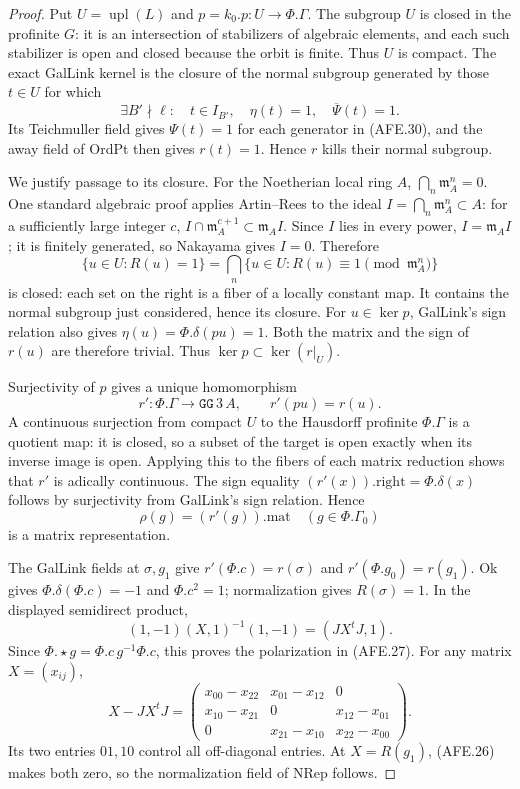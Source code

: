 \documentclass[11pt,a4paper]{article}
\numberwithin{equation}{section}
\theoremstyle{remark}\newtheorem{remark}[theorem]{Remark}
\begin{document}
\begin{proof}
Put \(U=\operatorname{upl}(L)\) and \(p=k_0.p:U\to\Phi.\Gamma\).
The subgroup \(U\) is closed in the profinite \(G\):
it is an intersection of stabilizers of algebraic
elements, and each such stabilizer is open and closed
because the orbit is finite.
Thus \(U\) is compact.
The exact GalLink kernel is the closure of the normal
subgroup generated by those \(t\in U\) for which
\[
 \exists B'\nmid\ell:\quad
 t\in I_{B'},\quad \eta(t)=1,\quad\overline\Psi(t)=1.
                                                        \tag{AFE.30}
\]
Its Teichmuller field gives \(\Psi(t)=1\) for each
generator in (AFE.30), and the away field of OrdPt
then gives \(r(t)=1\).
Hence \(r\) kills their normal subgroup.

We justify passage to its closure.
For the Noetherian local ring \(A\),
\(\bigcap_n\mathfrak m_A^n=0\).
One standard algebraic proof applies Artin--Rees
to the ideal \(I=\bigcap_n\mathfrak m_A^n\subset A\):
for a sufficiently large integer \(c\),
\(I\cap\mathfrak m_A^{c+1}\subset\mathfrak m_A I\).
Since \(I\) lies in every power, \(I=\mathfrak m_A I\);
it is finitely generated, so Nakayama gives \(I=0\).
Therefore
\[
 \{u\in U:R(u)=1\}=
 \bigcap_n\{u\in U:R(u)\equiv1\pmod{\mathfrak m_A^n}\}
 \]
is closed: each set on the right is a fiber of a
locally constant map.  It contains the normal
subgroup just considered, hence its closure.
For \(u\in\ker p\), GalLink's sign relation also gives
\(\eta(u)=\Phi.\delta(pu)=1\).
Both the matrix and the sign of \(r(u)\) are therefore
trivial.  Thus \(\ker p\subset\ker(r|_U)\).

Surjectivity of \(p\) gives a unique homomorphism
\[
                  r':\Phi.\Gamma\to\texttt{GG}\,3\,A,
                         \qquad r'(pu)=r(u).
 \]
A continuous surjection from compact \(U\) to the
Hausdorff profinite \(\Phi.\Gamma\) is a quotient map:
it is closed, so a subset of the target is open
exactly when its inverse image is open.
Applying this to the fibers of each matrix reduction
shows that \(r'\) is adically continuous.
The sign equality \((r'(x)).\mathrm{right}=\Phi.\delta(x)\)
follows by surjectivity from GalLink's sign relation.
Hence
\[
             \rho(g)=(r'(g)).\mathrm{mat}
                         \quad(g\in\Phi.\Gamma_0)
 \]
is a matrix representation.

The GalLink fields at \(\sigma,g_1\) give
\(r'(\Phi.c)=r(\sigma)\) and
\(r'(\Phi.g_0)=r(g_1)\).
Ok gives \(\Phi.\delta(\Phi.c)=-1\) and \(\Phi.c^2=1\);
normalization gives \(R(\sigma)=1\).
In the displayed semidirect product,
\[
 (1,-1)(X,1)^{-1}(1,-1)=(JX^tJ,1).
 \]
Since \(\Phi.\star g=\Phi.c\,g^{-1}\Phi.c\),
this proves the polarization in (AFE.27).
For any matrix \(X=(x_{ij})\),
\[
 X-JX^tJ=
 \begin{pmatrix}
 x_{00}-x_{22}&x_{01}-x_{12}&0\\
 x_{10}-x_{21}&0&x_{12}-x_{01}\\
 0&x_{21}-x_{10}&x_{22}-x_{00}
 \end{pmatrix}.
 \]
Its two entries \(01,10\) control all off-diagonal
entries.  At \(X=R(g_1)\), (AFE.26) makes both zero,
so the normalization field of NRep follows.


\end{proof}
\end{document}
